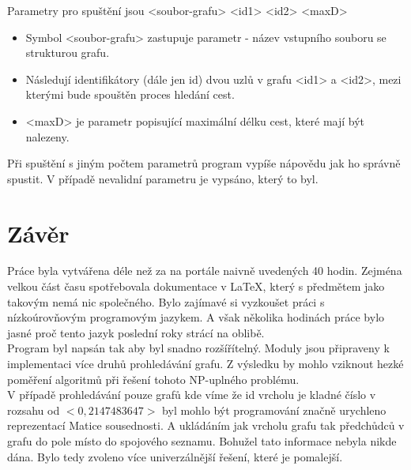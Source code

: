 Parametry pro spuštění jsou <soubor-grafu> <id1> <id2> <maxD>
\begin{itemize}
	\item Symbol <soubor-grafu> zastupuje parametr - název vstupního souboru se strukturou grafu.
	\item Následují identifikátory (dále jen id) dvou uzlů v grafu <id1> a <id2>, mezi kterými bude spouštěn proces hledání cest.
	\item <maxD> je parametr popisující maximální délku cest, které mají být nalezeny.
\end{itemize}

Při spuštění s jiným počtem parametrů program vypíše nápovědu jak ho správně spustit. V případě nevalidní parametru je vypsáno, který to byl. 

\chapter{Závěr}
Práce byla vytvářena déle než za na portále naivně uvedených 40 hodin. Zejména velkou část času spotřebovala dokumentace v \LaTeX, který s předmětem jako takovým nemá nic společného. Bylo zajímavé si vyzkoušet práci s nízkoúrovňovým programovým jazykem. A však několika hodinách práce bylo jasné proč tento jazyk poslední roky strácí na oblibě.\\
Program byl napsán tak aby byl snadno rozšířítelný. Moduly jsou připraveny k implementaci více druhů prohledávání grafu. Z výsledku by mohlo vziknout hezké poměření algoritmů při řešení tohoto NP-uplného problému.\\
V případě prohledávání pouze grafů kde víme že id vrcholu je kladné číslo v rozsahu od $<0,2147483647>$ byl mohlo být programování značně urychleno reprezentací Matice sousednosti. A ukládáním jak vrcholu grafu tak předchůdců v grafu do pole místo do spojového seznamu. Bohužel tato informace nebyla nikde dána. Bylo tedy zvoleno více univerzálnější řešení, které je pomalejší. 

